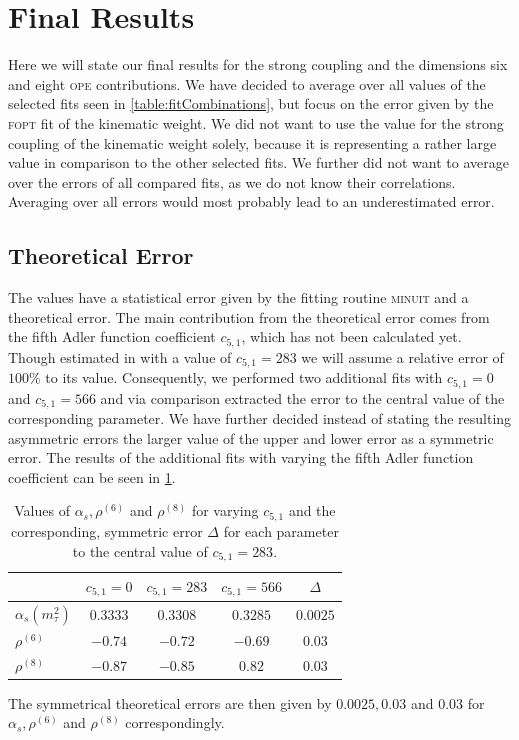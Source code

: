 \documentclass[../../index.tex]{subfiles}
\begin{document}
\section{Final Results}
Here we will state our final results for the strong coupling and the dimensions
six and eight \textsc{ope} contributions. We have decided to average over all
values of the selected fits seen in \cref{table:fitCombinations}, but focus on
the error given by the \textsc{fopt} fit of the kinematic weight. We did not
want to use the value for the strong coupling of the kinematic weight solely,
because it is representing a rather large value in comparison to the other
selected fits. We further did not want to average over the errors of all
compared fits, as we do not know their correlations. Averaging over all errors
would most probably lead to an underestimated error.

\subsection{Theoretical Error}
The values have a statistical error given by the fitting routine \textsc{minuit}
and a theoretical error. The main contribution from the theoretical error comes
from the fifth Adler function coefficient \(c_{5,1}\), which has not been
calculated yet. Though estimated in \cite{Beneke2008} with a value of \(c_{5,1}
= 283\) we will assume a relative error of \(100\%\) to its value. Consequently,
we performed two additional fits with \(c_{5,1} = 0 \) and \(c_{5,1} = 566\) and
via comparison extracted the error to the central value of the corresponding
parameter. We have further decided instead of stating the resulting asymmetric
errors the larger value of the upper and lower error as a symmetric error. The
results of the additional fits with varying the fifth Adler function coefficient
can be seen in \cref{table:theoreticalError}.
\begin{table}
  \centering
  \begin{tabular}{lcccc}
    \toprule
    & \(c_{5,1} = 0\) & \cellcolor{primary}\(c_{5,1}=283\) & \(c_{5,1}=566\) & \(\Delta\)\\
    \midrule
    \(\alpha_s(m_\tau^2)\) & \(0.3333\) & \cellcolor{primary}\(0.3308\) & \(0.3285\) & \(0.0025\) \\
    \(\rho^{(6)}\) &  \(-0.74\) & \cellcolor{primary}\(-0.72\) & \(-0.69\) & \(0.03\) \\
    \(\rho^{(8)}\) & \(-0.87\) & \cellcolor{primary}\(-0.85\) & \(0.82\) & \(0.03\) \\
    \bottomrule
  \end{tabular}
  \caption{Values of \(\alpha_s, \rho^{(6)}\) and \(\rho^{(8)}\) for varying
    \(c_{5,1}\) and the corresponding, symmetric error \(\Delta\) for each
    parameter to the central value of \(c_{5,1} = 283\).}
  \label{table:theoreticalError}
\end{table}
The symmetrical theoretical errors are then given by \(0.0025, 0.03\) and
\(0.03\) for \(\alpha_s, \rho^{(6)}\) and \(\rho^{(8)}\) correspondingly.
\end{document}
